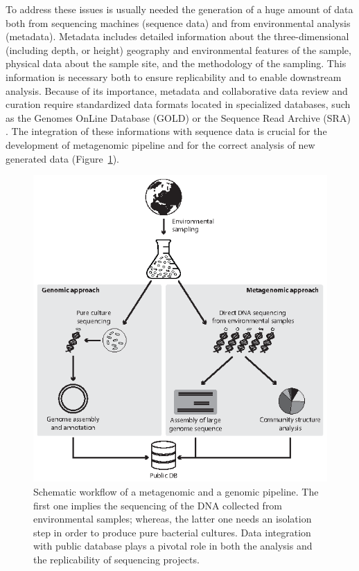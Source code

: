To address these issues is usually needed the generation of a huge amount of data both from sequencing machines (sequence data) and from environmental analysis (metadata). Metadata includes detailed information about the three-dimensional (including depth, or height) geography and environmental features of the sample, physical data about the sample site, and the methodology of the sampling. This information is necessary both to ensure replicability and to enable downstream analysis. Because of its importance, metadata and collaborative data review and curation require standardized data formats located in specialized databases, such as the Genomes OnLine Database (GOLD) \cite{pagani2012genomes} or the Sequence Read Archive (SRA) \cite{leinonen2010sequence}. The integration of these informations with sequence data is crucial for the development of metagenomic pipeline and for the correct analysis of new generated data (Figure~\ref{fig:metapipe}).\\%
\begin{figure}[!tb]
	\centering
	\includegraphics[width=1\textwidth]{./figures/Introduction/pipeline_mod}
  	\caption{Schematic workflow of a metagenomic and a genomic pipeline. The first one implies the sequencing of the DNA collected from environmental samples; whereas, the latter one needs an isolation step in order to produce pure bacterial cultures. Data integration with public database plays a pivotal role in both the analysis and the replicability of sequencing projects.
  	\label{fig:metapipe}}
\end{figure}%

